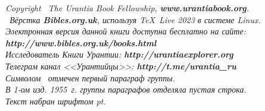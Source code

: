 \begin{center}
\begin{center}\end{center}
\itshape
{}
Copyright \textcopyright\ The Urantia Book Fellowship, {\upshape\bfseries www.urantiabook.org}.\\
\tux\ Вёрстка {\upshape\bfseries Bibles.org.uk}, используя \TeX\ Live 2023 в системе Linux.\\
Электронная версия данной книги доступна бесплатно на сайте:\\
{\upshape\bfseries http://www.bibles.org.uk/books.html}\\
Исследователь Книги Урантии: {\upshape\bfseries http://urantiaexplorer.org}\\
Телеграм канал <<Урантийцы>>: {\upshape\bfseries http://t.me/urantia\_ru}\\
Символом \pc\ отмечен первый параграф группы.\\
В 1-ом изд. 1955~г. группы параграфов отделяла пустая строка.\\
Текст набран шрифтом \textbf{\urantiamainfont} \urantiamainfontsize pt.\\[4pt]
\upshape\normalsize{}\bfseries\mytoday{}\\
\end{center}

\titleframe
